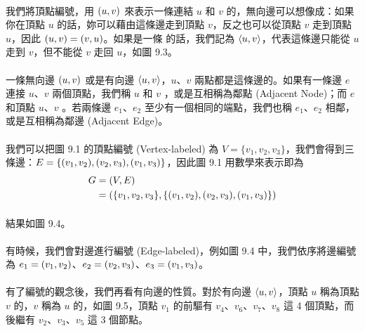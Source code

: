 \documentclass[12pt,a4paper,oneside]{report}
\begin{document}
\begin{CJK}{UTF8}{bkai}
\paragraph{}我們將頂點編號，用 $({u},{v})$ 來表示一條連結 $u$ 和 $v$ 的\textbf{}，無向邊可以想像成：如果你在頂點 $u$ 的話，妳可以藉由這條邊走到頂點 $v$，反之也可以從頂點 $v$ 走到頂點 $u$，因此 $({u},{v})=({v},{u})$。如果是一條\textbf{} 的話，我們記為 $\langle{}{{u},{v}}\rangle{}$，代表這條邊只能從 $u$ 走到 $v$，但不能從 $v$ 走回 $u$，如圖 9.3。
\paragraph{}一條無向邊 $({u},{v})$ 或是有向邊 $\langle{}{{u},{v}}\rangle{}$，$u$、$v$ 兩點都是這條邊的\textbf{}。如果有一條邊 $e$ 連接 $u$、$v$ 兩個頂點，我們稱 $u$ 和 $v$ \textbf{}，或是互相稱為鄰點 (Adjacent Node)；而 $e$ 和頂點 $u$、$v$ \textbf{}。若兩條邊 $e_1$、$e_2$ 至少有一個相同的端點，我們也稱 $e_1$、$e_2$ 相鄰，或是互相稱為鄰邊 (Adjacent Edge)。
\paragraph{}我們可以把圖 9.1 的頂點編號 (Vertex-labeled) 為 $V=\{v_1,v_2,v_3\}$，我們會得到三條邊：$E=\{({v_1},{v_2}),({v_2},{v_3}),({v_1},{v_3})\}$，因此圖 9.1 用數學來表示即為
\begin{align*}
G&=(V,E)\\
 &=(\{v_1,v_2,v_3\},\{({v_1},{v_2}),({v_2},{v_3}),({v_1},{v_3})\})
\end{align*}
\paragraph{}結果如圖 9.4。
\paragraph{}有時候，我們會對邊進行編號 (Edge-labeled)，例如圖 9.4 中，我們依序將邊編號為 $e_1=({v_1},{v_2})$、$e_2=({v_2},{v_3})$、$e_3=({v_1},{v_3})$。
\paragraph{}有了編號的觀念後，我們再看有向邊的性質。對於有向邊 $\langle{}{{u},{v}}\rangle{}$，頂點 $u$ 稱為頂點 $v$ 的，$v$ 稱為 $u$ 的，如圖 9.5，頂點 $v_1$ 的前驅有 $v_4$、$v_6$、$v_7$、$v_8$ 這 4 個頂點，而後繼有 $v_2$、$v_3$、$v_5$ 這 3 個節點。

\end{CJK}
\end{document}
